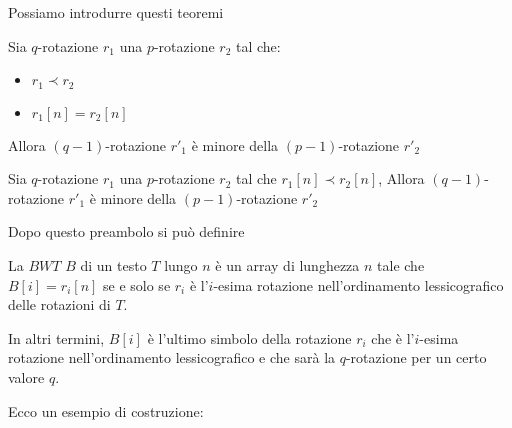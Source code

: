 Possiamo introdurre questi teoremi
\begin{teorema}
    Sia $q$-rotazione $r_1$ una $p$-rotazione $r_2$ tal che:
    \begin{itemize}
        \item $r_1\prec r_2$
        \item $r_1[n]=r_2[n]$
    \end{itemize}
    Allora $(q-1)$-rotazione $r'_1$ è minore della $(p-1)$-rotazione $r'_2$
\end{teorema}
\begin{teorema}
    Sia $q$-rotazione $r_1$ una $p$-rotazione $r_2$ tal che $r_1[n]\prec r_2[n]$,
    Allora $(q-1)$-rotazione $r'_1$ è minore della $(p-1)$-rotazione $r'_2$
\end{teorema}
Dopo questo preambolo si può definire
\begin{definizione}
    La $BWT$ $B$ di un testo $T$ lungo $n$ è un array di lunghezza $n$ tale che
    $B[i]=r_i[n]$ se e solo se $r_i$ è l'$i$-esima rotazione nell'ordinamento
    lessicografico delle rotazioni di $T$.

    In altri termini, $B[i]$ è l'ultimo simbolo della rotazione $r_i$ che è
    l'$i$-esima rotazione nell'ordinamento lessicografico e che sarà la
    $q$-rotazione per un certo valore $q$.
\end{definizione}
Ecco un esempio di costruzione:
